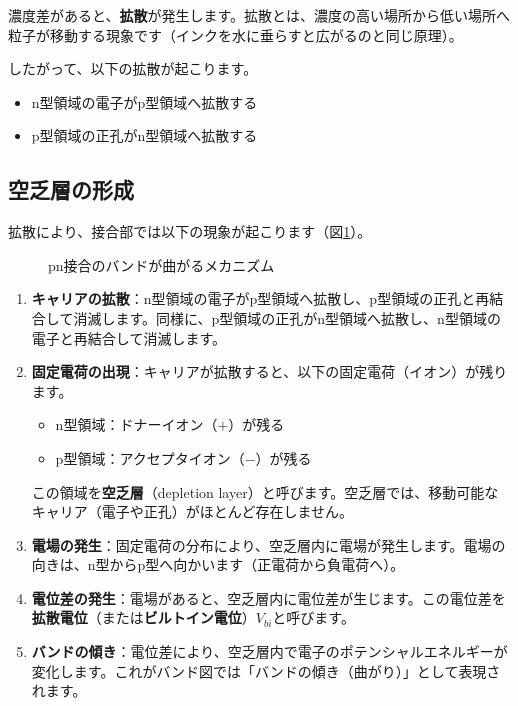 濃度差があると、\textbf{拡散}が発生します。拡散とは、濃度の高い場所から低い場所へ粒子が移動する現象です（インクを水に垂らすと広がるのと同じ原理）。

したがって、以下の拡散が起こります。
\begin{itemize}
\item n型領域の電子がp型領域へ拡散する
\item p型領域の正孔がn型領域へ拡散する
\end{itemize}

\subsection{空乏層の形成}

拡散により、接合部では以下の現象が起こります（図\ref{fig:pn_junction_mechanism}）。

\begin{figure}[H]
\centering
{}
\caption{pn接合のバンドが曲がるメカニズム}
\label{fig:pn_junction_mechanism}
\end{figure}

\begin{enumerate}
\item \textbf{キャリアの拡散}：n型領域の電子がp型領域へ拡散し、p型領域の正孔と再結合して消滅します。同様に、p型領域の正孔がn型領域へ拡散し、n型領域の電子と再結合して消滅します。

\item \textbf{固定電荷の出現}：キャリアが拡散すると、以下の固定電荷（イオン）が残ります。
\begin{itemize}
\item n型領域：ドナーイオン（$+$）が残る
\item p型領域：アクセプタイオン（$-$）が残る
\end{itemize}
この領域を\textbf{空乏層}（depletion layer）と呼びます。空乏層では、移動可能なキャリア（電子や正孔）がほとんど存在しません。

\item \textbf{電場の発生}：固定電荷の分布により、空乏層内に電場が発生します。電場の向きは、n型からp型へ向かいます（正電荷から負電荷へ）。

\item \textbf{電位差の発生}：電場があると、空乏層内に電位差が生じます。この電位差を\textbf{拡散電位}（または\textbf{ビルトイン電位}）$V_{bi}$と呼びます。

\item \textbf{バンドの傾き}：電位差により、空乏層内で電子のポテンシャルエネルギーが変化します。これがバンド図では「バンドの傾き（曲がり）」として表現されます。
\end{enumerate}

